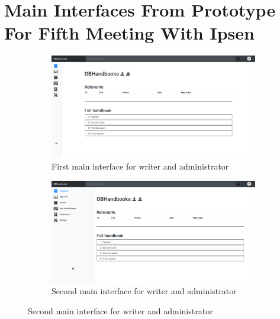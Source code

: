 \section{Main Interfaces From Prototype For Fifth Meeting With Ipsen}\label{sec:3prototype}
\begin{figure}[H]
	\centering
	\begin{subfigure}[b]{0.48\textwidth}
		\includegraphics[width=\textwidth]{billeder/iteration3Prototyper/MainWriteAdmin.png}
		\caption{First main interface for writer and administrator}
		\label{fig:5-Main1Write}
	\end{subfigure}
	\quad
	\begin{subfigure}[b]{0.48\textwidth}
		\includegraphics[width=\textwidth]{billeder/iteration3Prototyper/MainWriteAdmin2.png}
		\caption{Second main interface for writer and administrator}
		\label{fig:5-Main2write}
	\end{subfigure}
\end{figure}
